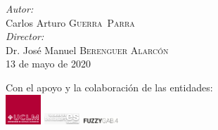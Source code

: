 \begin{titlepage}

\emph{Autor:}\\
Carlos Arturo \textsc{Guerra~Parra} %
\\[0.5cm]
\emph{Director:} \\
Dr. José Manuel \textsc{Berenguer Alarcón} %
\\[0.7cm]



{\large 13 de mayo de 2020} %


 

\vfill %

{\tiny Con el apoyo y la colaboración de las entidades:}\\
\includegraphics[width=0.1\textwidth]{./portada/logoUCLM}
\includegraphics[width=0.1\textwidth]{./portada/logoBellasartes}
\includegraphics[width=0.1\textwidth]{./portada/logoFuzzyGab}

\end{titlepage}